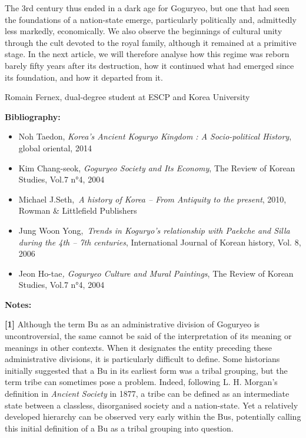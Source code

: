 \documentclass[11pt,a4paper]{article}
\begin{document}
The 3rd century thus ended in a dark age for Goguryeo, but one that had seen the foundations of a nation-state emerge, particularly politically and, admittedly less markedly, economically. We also observe the beginnings of cultural unity through the cult devoted to the royal family, although it remained at a primitive stage. In the next article, we will therefore analyse how this regime was reborn barely fifty years after its destruction, how it continued what had emerged since its foundation, and how it departed from it.

Romain Fernex, dual-degree student at ESCP and Korea University

\textbf{Bibliography:}

\begin{itemize}
\item
  Noh Taedon, \emph{Korea's Ancient Koguryo Kingdom : A Socio-political History}, global oriental, 2014
\item
  Kim Chang-seok, \emph{Goguryeo Society and Its Economy}, The Review of Korean Studies, Vol.7 n°4, 2004
\item
  Michael J.Seth,~\emph{A history of Korea -- From Antiquity to the present}, 2010, Rowman \& Littlefield Publishers
\item
  Jung Woon Yong,\emph{~Trends in Koguryo's relationship with Paekche and Silla during the 4th -- 7th centuries}, International Journal of Korean history, Vol. 8, 2006
\item
  Jeon Ho-tae\emph{, Goguryeo Culture and Mural Paintings}, The Review of Korean Studies, Vol.7 n°4, 2004
\end{itemize}

\textbf{Notes:}

\textbf{{[}1{]}} Although the term Bu as an administrative division of Goguryeo is uncontroversial, the same cannot be said of the interpretation of its meaning or meanings in other contexts. When it designates the entity preceding these administrative divisions, it is particularly difficult to define. Some historians initially suggested that a Bu in its earliest form was a tribal grouping, but the term tribe can sometimes pose a problem. Indeed, following L. H. Morgan's definition in \emph{Ancient Society} in 1877, a tribe can be defined as an intermediate state between a classless, disorganised society and a nation-state. Yet a relatively developed hierarchy can be observed very early within the Bus, potentially calling this initial definition of a Bu as a tribal grouping into question.
\end{document}
